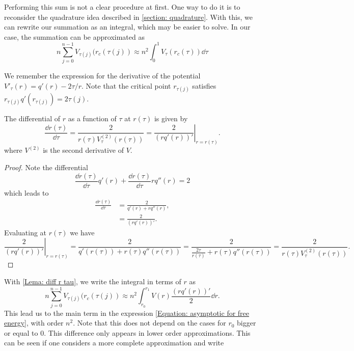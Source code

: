 Performing this sum is not a clear procedure at first. One way to do it is to  reconsider the quadrature idea described in \autoref{section: quadrature}. With this, we can rewrite our summation as an integral, which may be easier to solve. In our case, the summation can be approximated as
\begin{equation}
	n \sum_{j=0}^{n-1} V_{\tau(j)}(r_c(\tau(j)) \approx n^2 \int_{0}^{1} V_{\tau}(r_c(\tau)) \dd \tau
\end{equation}

We remember the expression for the derivative of the potential $V'_\tau(r) = q'(r) - 2\tau/r$. Note that the critical point $r_{\tau(j)}$ satisfies $r_{\tau(j)} q'(r_{\tau(j)}) = 2 \tau(j)$. 

\begin{lema}	\label{Lema: diff r tau}
	The differential of $r$ as a function of $\tau$ at $r(\tau)$ is given by
	\begin{equation}
		\frac{\dd r(\tau)}{\dd \tau} = \frac{2}{r(\tau) V^{(2)}_\tau(r(\tau))} = \left. \frac{2}{(r q'(r))'} \right|_{r = r(\tau)}.
		\label{Equation: differential}
	\end{equation}
	where $V^{(2)}$ is the second derivative of $V$.
\end{lema}
\begin{proof}
	Note the differential
	\begin{equation}
		\frac{\dd r(\tau)}{\dd \tau} q'(r) + \frac{\dd r(\tau)}{\dd \tau} r q''(r) = 2
	\end{equation}
	which leads to
	\begin{align}
		\frac{\dd r(\tau)}{\dd \tau} & = \frac{2}{q'(r) + rq''(r)}, \\ & = \frac{2}{(r q'(r))'}.
	\end{align}
	Evaluating at $r(\tau)$ we have
	\begin{equation}
		\left. \frac{2}{(r q'(r))'} \right|_{r = r(\tau)} =   \frac{2}{q'(r(\tau)) + r(\tau)q''(r(\tau))} =   \frac{2}{\frac{2\tau}{r(\tau)} + r(\tau)q''(r(\tau))}  =  \frac{2}{r(\tau) V^{(2)}_\tau(r(\tau))}.
	\end{equation}
\end{proof}
With \autoref{Lema: diff r tau}, we write the integral in terms of $r$ as
\begin{equation}
		n \sum_{j=0}^{n-1} V_{\tau(j)}(r_c(\tau(j)) \approx n^2 \int_{r_0}^{r_1} V(r) \frac{(r q'(r))'}{2} \dd r.
\end{equation}
This lead us to the main term in the expression  \eqref{Equation: asymptotic for free energy}, with order $n^2$. Note that this does not depend on the cases for $r_0$ bigger or equal to $0$. This difference only appears in lower order approximations. This can be seen if one considers a more complete approximation and write

